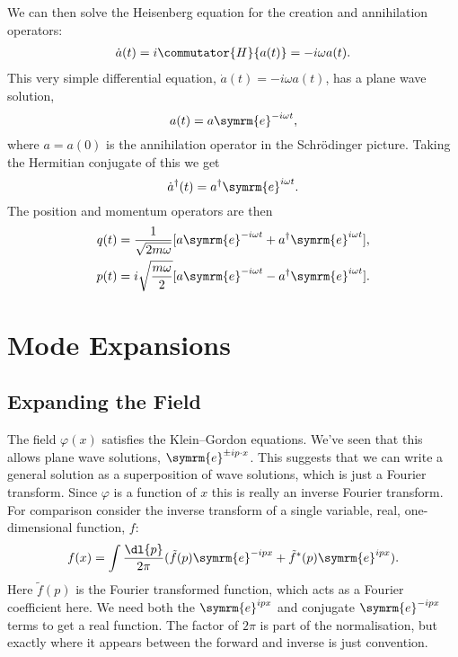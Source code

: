 \documentclass[fleqn]{NotesClass}
\newcommand{\e}{\symrm{e}}
\newcommand{\hermit}{{\dagger}}
\begin{document}
    We can then solve the Heisenberg equation for the creation and annihilation operators:
    \begin{align}
        \dot{a}(t) = i \commutator{H}{a(t)} = -i \omega a(t).
    \end{align}
    This very simple differential equation, \(\dot{a}(t) = -i\omega a(t)\), has a plane wave solution,
    \begin{equation}
        a(t) = a \e^{-i\omega t},
    \end{equation}
    where \(a = a(0)\) is the annihilation operator in the Schrödinger picture.
    Taking the Hermitian conjugate of this we get
    \begin{equation}
        \dot{a}^\hermit(t) = a^\hermit \e^{i\omega t}.
    \end{equation}
    The position and momentum operators are then
    \begin{align}
        q(t) &= \frac{1}{\sqrt{2m\omega}} [a \e^{-i\omega t} + a^\hermit \e^{i\omega t}],\\
        p(t) &= i\sqrt{\frac{m\omega}{2}} [a \e^{-i\omega t} - a^\hermit \e^{i\omega t}].
    \end{align}
    
    \chapter{Mode Expansions}
    \section{Expanding the Field}
    The field \(\varphi(x)\) satisfies the Klein--Gordon equations.
    We've seen that this allows plane wave solutions, \(\e^{\pm i p \cdot x}\).
    This suggests that we can write a general solution as a superposition of wave solutions, which is just a Fourier transform.
    Since \(\varphi\) is a function of \(x\) this is really an inverse Fourier transform.
    For comparison consider the inverse transform of a single variable, real, one-dimensional function, \(f\):
    \begin{equation}
        f(x) = \int \frac{\dl{p}}{2\pi} (\tilde{f}(p) \e^{-ip x} + \tilde{f}^*(p) \e^{ip x}).
    \end{equation}
    Here \(\tilde{f}(p)\) is the Fourier transformed function, which acts as a Fourier coefficient here.
    We need both the \(\e^{ipx}\) and conjugate \(\e^{-ipx}\) terms to get a real function.
    The factor of \(2\pi\) is part of the normalisation, but exactly where it appears between the forward and inverse is just convention.
    
\end{document}
